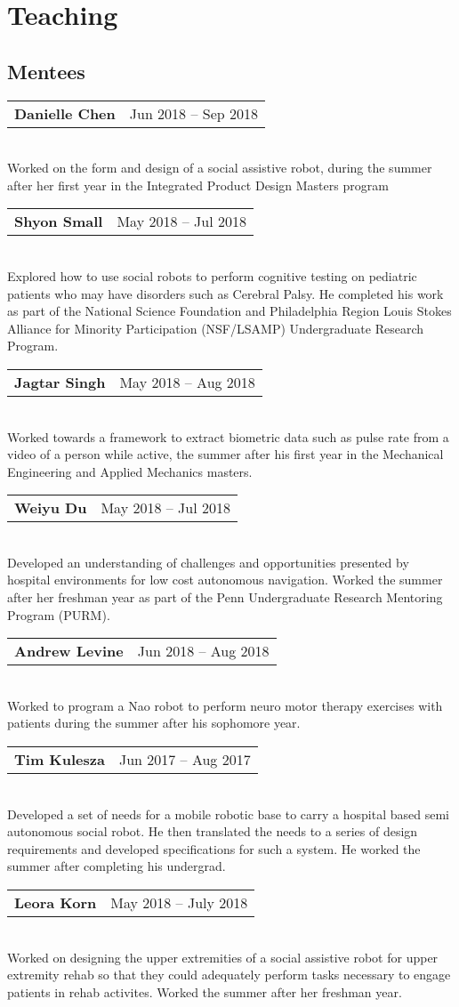 \documentclass[10pt, letter]{article}
\makeatletter
\newlength{\currentparskip}
\newlength{\cvindent}
\newenvironment{cvsection}[1]{
    \section*{#1}   
}{
}
\newenvironment{cvsubsection}[1]{
    \subsection*{#1}
}{
}
\newcommand{\cvmentee}[4]{
    \setlength{\currentparskip}{\parskip}%
    \strut\hfill\begin{minipage}{\dimexpr\textwidth-\cvindent}
    \setlength{\parskip}{\currentparskip}%
    \begin{tabular*}{\linewidth}{@{}l@{\extracolsep{\fill}}r@{}}
        \textbf{#1} & #2 -- #3
    \end{tabular*}\\[.05cm]
    #4
    \end{minipage}
    \vspace{.3cm}
}
\makeatother
\begin{document}
\begin{cvsection}{Teaching}
\begin{cvsubsection}{Mentees}
        \cvmentee{Danielle Chen}{Jun 2018}{Sep 2018}{Worked on the form and design of a social assistive robot, during the summer after her first year in the Integrated Product Design Masters program}
        
        \cvmentee{Shyon Small}{May 2018}{Jul 2018}{Explored how to use social robots to perform cognitive testing on pediatric patients who may have disorders such as Cerebral Palsy. He completed his work as part of the National Science Foundation and Philadelphia Region Louis Stokes Alliance for Minority Participation (NSF/LSAMP) Undergraduate Research Program.}

        \cvmentee{Jagtar Singh}{May 2018}{Aug 2018}{Worked towards a framework to extract biometric data such as pulse rate from a video of a person while active, the summer after his first year in the Mechanical Engineering and Applied Mechanics masters.}

        \cvmentee{Weiyu Du}{May 2018}{Jul 2018}{Developed an understanding of challenges and opportunities presented by hospital environments for low cost autonomous navigation. Worked the summer after her freshman year as part of the Penn Undergraduate Research Mentoring Program (PURM).}

        \cvmentee{Andrew Levine}{Jun 2018}{Aug 2018}{Worked to program a Nao robot to perform neuro motor therapy exercises with patients during the summer after his sophomore year.}

        \cvmentee{Tim Kulesza}{Jun 2017}{Aug 2017}{Developed a set of needs for a mobile robotic base to carry a hospital based semi autonomous social robot. He then translated the needs to a series of design requirements and developed specifications for such a system. He worked the summer after completing his undergrad.}

        \cvmentee{Leora Korn}{May 2018}{July 2018}{Worked on designing the upper extremities of a social assistive robot for upper extremity rehab so that they could adequately perform tasks necessary to engage patients in rehab activites. Worked the summer after her freshman year.}

    \end{cvsubsection}
\end{cvsection}
\end{document}
